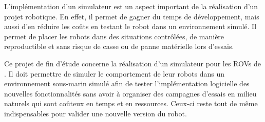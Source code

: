L'implémentation d'un simulateur est un aspect important de la réalisation d'un projet robotique. En effet, il permet de gagner du temps de développement, mais aussi d'en réduire les coûts en testant le robot dans un environnement simulé. Il permet de placer les robots dans des situations contrôlées, de manière reproductible et sans risque de casse ou de panne matérielle lors d'essais.

Ce projet de fin d'étude concerne la réalisation d'un simulateur pour les \gls{ROV}s de \forssea{}. Il doit permettre de simuler le comportement de leur robots dans un environnement sous-marin simulé afin de tester l'implémentation logicielle des nouvelles fonctionnalités sans avoir à organiser des campagnes d'essais en milieu naturels qui sont coûteux en temps et en ressources. Ceux-ci reste tout de même indispensables pour valider une nouvelle version du robot.
